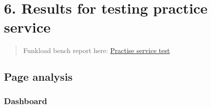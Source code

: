 \documentclass[letterpaper,10pt,english]{sphinxmanual}
\begin{document}
\chapter{6. Results for testing practice service}
\label{index:results-for-testing-practice-service}\begin{quote}

Funkload bench report here: \href{http://197.221.50.101/stats/test\_practice-20130823T121013/}{Practise service test}
\end{quote}


\section{Page analysis}
\label{index:id3}

\subsection{Dashboard}
\end{document}
